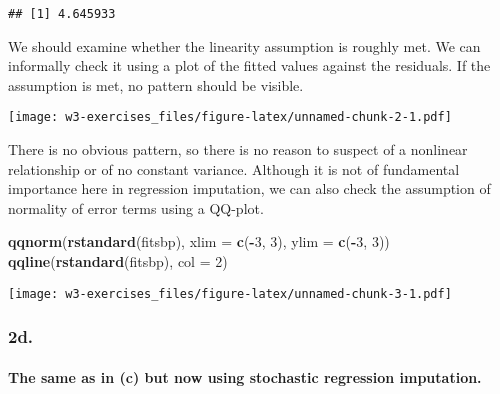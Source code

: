 \documentclass[
]{article}
\newenvironment{Shaded}{\begin{snugshade}}{\end{snugshade}}
\newcommand{\DataTypeTok}[1]{\textcolor[rgb]{0.13,0.29,0.53}{#1}}
\newcommand{\DecValTok}[1]{\textcolor[rgb]{0.00,0.00,0.81}{#1}}
\newcommand{\KeywordTok}[1]{\textcolor[rgb]{0.13,0.29,0.53}{\textbf{#1}}}
\newcommand{\NormalTok}[1]{#1}
\newcommand{\OperatorTok}[1]{\textcolor[rgb]{0.81,0.36,0.00}{\textbf{#1}}}
\newcommand{\StringTok}[1]{\textcolor[rgb]{0.31,0.60,0.02}{#1}}
\begin{document}
\begin{verbatim}
## [1] 4.645933
\end{verbatim}

We should examine whether the linearity assumption is roughly met. We
can informally check it using a plot of the fitted values against the
residuals. If the assumption is met, no pattern should be visible.

\begin{Shaded}
\end{Shaded}

\texttt{[image: w3-exercises\_files/figure-latex/unnamed-chunk-2-1.pdf]}

There is no obvious pattern, so there is no reason to suspect of a
nonlinear relationship or of no constant variance. Although it is not of
fundamental importance here in regression imputation, we can also check
the assumption of normality of error terms using a QQ-plot.

\begin{Shaded}
\begin{Highlighting}[]
\KeywordTok{qqnorm}\NormalTok{(}\KeywordTok{rstandard}\NormalTok{(fitsbp), }\DataTypeTok{xlim =} \KeywordTok{c}\NormalTok{(}\OperatorTok{{-}}\DecValTok{3}\NormalTok{, }\DecValTok{3}\NormalTok{), }\DataTypeTok{ylim =} \KeywordTok{c}\NormalTok{(}\OperatorTok{{-}}\DecValTok{3}\NormalTok{, }\DecValTok{3}\NormalTok{))}
\KeywordTok{qqline}\NormalTok{(}\KeywordTok{rstandard}\NormalTok{(fitsbp), }\DataTypeTok{col =} \DecValTok{2}\NormalTok{)}
\end{Highlighting}
\end{Shaded}

\texttt{[image: w3-exercises\_files/figure-latex/unnamed-chunk-3-1.pdf]}

\hypertarget{d.}{%
\subsubsection{2d.}\label{d.}}

\hypertarget{the-same-as-in-c-but-now-using-stochastic-regression-imputation.}{%
\paragraph{The same as in (c) but now using stochastic regression
imputation.}\label{the-same-as-in-c-but-now-using-stochastic-regression-imputation.}}
\end{document}

